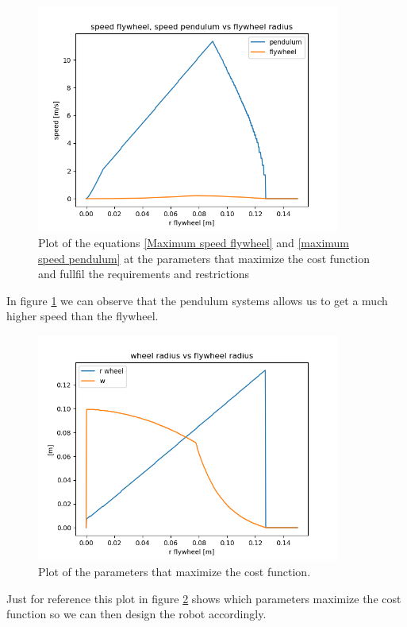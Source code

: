 \begin{figure}[H]
	\centering
	\includegraphics[width=10cm]{img/optimization/speed.png}
	\caption{Plot of the equations \ref{Maximum speed flywheel} and \ref{maximum speed pendulum} at the parameters that maximize the cost function and fullfil the requirements and restrictions}
	\label{fig:Speed plot}
\end{figure}
In figure \ref{fig:Speed plot} we can observe that the pendulum systems allows us to get a much higher speed than the flywheel.

\begin{figure}[H]
	\centering
	\includegraphics[width=10cm]{img/optimization/parameters.png}
	\caption{Plot of the parameters that maximize the cost function.}
	\label{fig:Parameters plot}
\end{figure}
Just for reference this plot in figure \ref{fig:Parameters plot} shows which parameters maximize the cost function so we can then design the robot accordingly.

